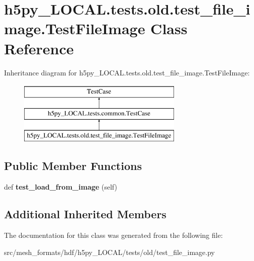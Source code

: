 \hypertarget{classh5py__LOCAL_1_1tests_1_1old_1_1test__file__image_1_1TestFileImage}{}\section{h5py\+\_\+\+L\+O\+C\+A\+L.\+tests.\+old.\+test\+\_\+file\+\_\+image.\+Test\+File\+Image Class Reference}
\label{classh5py__LOCAL_1_1tests_1_1old_1_1test__file__image_1_1TestFileImage}
Inheritance diagram for h5py\+\_\+\+L\+O\+C\+A\+L.\+tests.\+old.\+test\+\_\+file\+\_\+image.\+Test\+File\+Image\+:\begin{figure}[H]
\begin{center}
\leavevmode
\includegraphics[height=3.000000cm]{classh5py__LOCAL_1_1tests_1_1old_1_1test__file__image_1_1TestFileImage}
\end{center}
\end{figure}
\subsection*{Public Member Functions}
\begin{DoxyCompactItemize}
\item 
\mbox{\label{classh5py__LOCAL_1_1tests_1_1old_1_1test__file__image_1_1TestFileImage_a2ceb499832953fa3bf7e3bd66331f955}} 
def {\bfseries test\+\_\+load\+\_\+from\+\_\+image} (self)
\end{DoxyCompactItemize}
\subsection*{Additional Inherited Members}


The documentation for this class was generated from the following file\+:\begin{DoxyCompactItemize}
\item 
src/mesh\+\_\+formats/hdf/h5py\+\_\+\+L\+O\+C\+A\+L/tests/old/test\+\_\+file\+\_\+image.\+py\end{DoxyCompactItemize}
